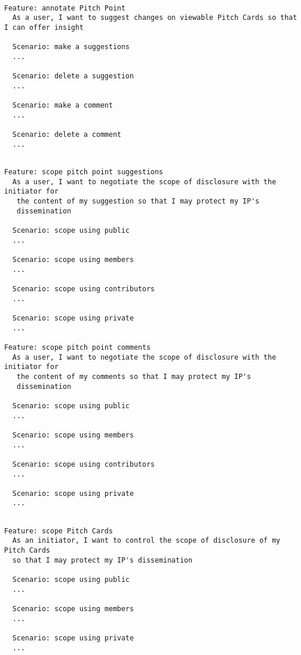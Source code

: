 \begin{verbatim}

Feature: annotate Pitch Point
  As a user, I want to suggest changes on viewable Pitch Cards so that I can offer insight

  Scenario: make a suggestions
  ...

  Scenario: delete a suggestion
  ...

  Scenario: make a comment
  ...

  Scenario: delete a comment
  ...

\end{verbatim}

\begin{verbatim}

Feature: scope pitch point suggestions
  As a user, I want to negotiate the scope of disclosure with the initiator for
   the content of my suggestion so that I may protect my IP's 
   dissemination

  Scenario: scope using public
  ...

  Scenario: scope using members
  ...

  Scenario: scope using contributors
  ...

  Scenario: scope using private
  ...

Feature: scope pitch point comments
  As a user, I want to negotiate the scope of disclosure with the initiator for
   the content of my comments so that I may protect my IP's 
   dissemination

  Scenario: scope using public
  ...

  Scenario: scope using members
  ...

  Scenario: scope using contributors
  ...

  Scenario: scope using private
  ...

\end{verbatim}

\begin{verbatim}

Feature: scope Pitch Cards
  As an initiator, I want to control the scope of disclosure of my Pitch Cards 
  so that I may protect my IP's dissemination

  Scenario: scope using public
  ...

  Scenario: scope using members
  ...

  Scenario: scope using private
  ...

\end{verbatim}

